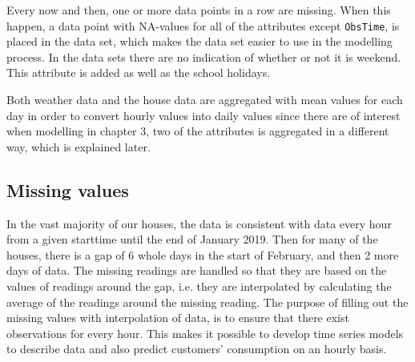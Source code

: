 \noindent Every now and then, one or more data points in a row are missing. When this happen, a data point with NA-values for all of the attributes except \texttt{ObsTime}, is placed in the data set, which makes the data set easier to use in the modelling process. In the data sets there are no indication of whether or not it is weekend. This attribute is added as well as the school holidays.

\noindent Both weather data and the house data are aggregated with mean values for each day in order to convert hourly values into daily values since there are of interest when modelling in chapter 3, two of the attributes is aggregated in a different way, which is explained later.





\subsection{Missing values}
In the vast majority of our houses, the data is consistent with data every hour from a given starttime until the end of January 2019. Then for many of the houses, there is a gap of 6 whole days in the start of February, and then 2 more days of data. The missing readings are handled so that they are based on the values of readings around the gap, i.e. they are interpolated by calculating the average of the readings around the missing reading. 
The purpose of filling out the missing values with interpolation of data, is to ensure that there exist observations for every hour. This makes it possible to develop time series models to describe data and also predict customers' consumption on an hourly basis. 




